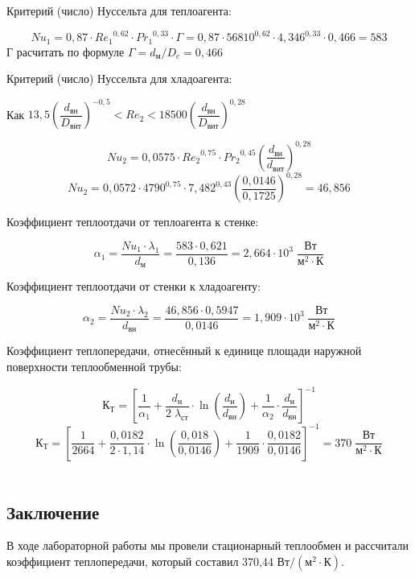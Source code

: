 \documentclass[12pt, a4paper]{article}
\begin{document}
\begin{flushleft}
Критерий (число) Нуссельта для теплоагента:
\end{flushleft}
$$Nu_1 = 0,87 \cdot {Re_1}^{0,62} \cdot {Pr_1}^{0,33} \cdot \Gamma = 0,87 \cdot 56810^{0,62} \cdot 4,346^{0,33} \cdot 0,466 = 583$$
Г расчитать по формуле $\Gamma = d_{\textrm{м}} / D_c = 0,466$ 
\newpage

\begin{flushleft}
Критерий (число) Нуссельта для хладоагента:
\end{flushleft}

\begin{center}
Как $13,5 \left(\dfrac{d_{\textrm{вн}}}{D_{\textrm{вит}}}\right)^{-0,5} < Re_2 < 18500 \left(\dfrac{d_{\textrm{вн}}}{D_{\textrm{вит}}}\right)^{0,28}$
\end{center}
$$Nu_2 = 0,0575 \cdot {Re_2}^{0,75} \cdot {Pr_2}^{0,45} \left(\dfrac{d_{\textrm{вн}}}{d_{\textrm{вит}}}\right)^{0,28}$$
$$Nu_2= 0,0572 \cdot 4790^{0,75} \cdot 7,482^{0,43} \left(\frac{0,0146}{0,1725}\right)^{0,28} = 46,856$$

\begin{flushleft}
Коэффициент теплоотдачи от теплоагента к стенке:
\end{flushleft}
$$\alpha_1 = \dfrac{Nu_1 \cdot \lambda_1}{d_{\textrm{м}}} = \dfrac{583 \cdot 0,621}{0,136} = 2,664 \cdot 10^3 \; \dfrac{\textrm{Вт}}{\textrm{м}^2 \cdot \textrm{К}}$$

\begin{flushleft}
Коэффициент теплоотдачи от стенки к хладоагенту:
\end{flushleft}
$$\alpha_2 = \dfrac{Nu_2 \cdot \lambda_2}{d_{\textrm{вн}}} = \dfrac{46,856 \cdot 0,5947}{0,0146} = 1,909 \cdot 10^3 \; \dfrac{\textrm{Вт}}{\textrm{м}^2 \cdot \textrm{К}}$$

\begin{flushleft}
Коэффициент теплопередачи, отнесённый к единице
площади наружной поверхности теплообменной трубы:
\end{flushleft}
$$\textrm{К}_{\textrm{Т}} = \left[ \dfrac{1}{\alpha_{1}} + \dfrac{d_{\textrm{н}}}{2\; \lambda_{\textrm{ст}}} \cdot \ln \left( \dfrac{d_{\textrm{н}}}{d_{\textrm{вн}}} \right) + \dfrac{1}{\alpha_{2}} \cdot \dfrac{d_{\textrm{н}}}{d_{\textrm{вн}}} \right]^{-1}$$
$$\textrm{К}_{\textrm{Т}} = \left[\dfrac{1}{2664} + \dfrac{0,0182}{2 \cdot 1,14} \cdot \ln \left(\dfrac{0,018}{0,0146} \right) + \dfrac{1}{1909} \cdot \dfrac{0,0182}{0,0146} \right]^{-1} = 370 \; \dfrac{\textrm{Вт}}{\textrm{м}^2 \cdot \textrm{К}}$$\\


\begin{center}
\subsection*{Заключение}
\end{center}

В ходе лабораторной работы мы провели стационарный теплообмен и рассчитали коэффициент теплопередачи, который составил 370,44 $\textrm{Вт}/\left(\textrm{м}^2 \cdot \textrm{К}\right)$.
\end{document}
